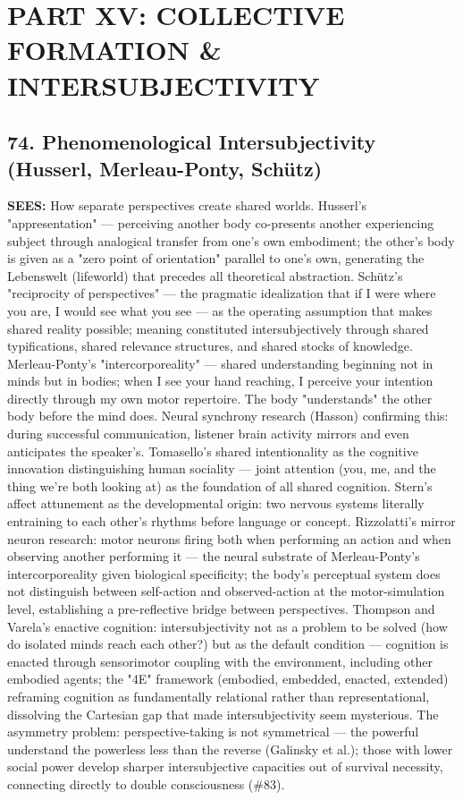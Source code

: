 \chapter*{PART XV: COLLECTIVE FORMATION \& INTERSUBJECTIVITY}


\section*{74. Phenomenological Intersubjectivity (Husserl, Merleau-Ponty, Schütz)}


\textbf{SEES:} How separate perspectives create shared worlds. Husserl's "appresentation" — perceiving another body co-presents another experiencing subject through analogical transfer from one's own embodiment; the other's body is given as a "zero point of orientation" parallel to one's own, generating the Lebenswelt (lifeworld) that precedes all theoretical abstraction. Schütz's "reciprocity of perspectives" — the pragmatic idealization that if I were where you are, I would see what you see — as the operating assumption that makes shared reality possible; meaning constituted intersubjectively through shared typifications, shared relevance structures, and shared stocks of knowledge. Merleau-Ponty's "intercorporeality" — shared understanding beginning not in minds but in bodies; when I see your hand reaching, I perceive your intention directly through my own motor repertoire. The body "understands" the other body before the mind does. Neural synchrony research (Hasson) confirming this: during successful communication, listener brain activity mirrors and even anticipates the speaker's. Tomasello's shared intentionality as the cognitive innovation distinguishing human sociality — joint attention (you, me, and the thing we're both looking at) as the foundation of all shared cognition. Stern's affect attunement as the developmental origin: two nervous systems literally entraining to each other's rhythms before language or concept. Rizzolatti's mirror neuron research: motor neurons firing both when performing an action and when observing another performing it — the neural substrate of Merleau-Ponty's intercorporeality given biological specificity; the body's perceptual system does not distinguish between self-action and observed-action at the motor-simulation level, establishing a pre-reflective bridge between perspectives. Thompson and Varela's enactive cognition: intersubjectivity not as a problem to be solved (how do isolated minds reach each other?) but as the default condition — cognition is enacted through sensorimotor coupling with the environment, including other embodied agents; the "4E" framework (embodied, embedded, enacted, extended) reframing cognition as fundamentally relational rather than representational, dissolving the Cartesian gap that made intersubjectivity seem mysterious. The asymmetry problem: perspective-taking is not symmetrical — the powerful understand the powerless less than the reverse (Galinsky et al.); those with lower social power develop sharper intersubjective capacities out of survival necessity, connecting directly to double consciousness (\#83).


